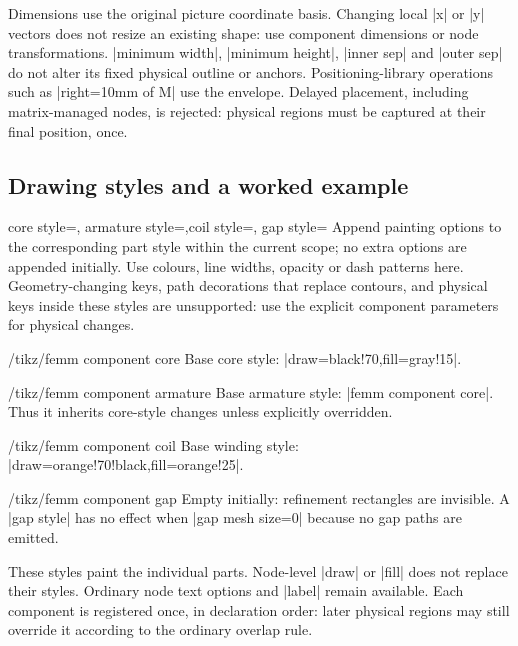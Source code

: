 Dimensions use the original picture coordinate basis. Changing local |x|
or |y| vectors does not resize an existing shape: use component dimensions or
node transformations. |minimum width|, |minimum height|, |inner sep| and
|outer sep| do not alter its fixed physical outline or anchors.
Positioning-library operations such as |right=10mm of M| use the envelope.
Delayed placement, including matrix-managed nodes, is rejected: physical
regions must be captured at their final position, once.

\subsection{Drawing styles and a worked example}
\begin{keylist}{core style=,
  armature style=,coil style=,
  gap style=}
Append painting options to the corresponding part style within the current
scope; no extra options are appended initially. Use colours, line widths,
opacity or dash patterns here. Geometry-changing keys, path decorations
that replace contours, and physical keys inside these styles are unsupported:
use the explicit component parameters for physical changes.
\end{keylist}
\begin{stylekey}{/tikz/femm component core}
Base core style: |draw=black!70,fill=gray!15|.
\end{stylekey}
\begin{stylekey}{/tikz/femm component armature}
Base armature style: |femm component core|. Thus it inherits core-style changes
unless explicitly overridden.
\end{stylekey}
\begin{stylekey}{/tikz/femm component coil}
Base winding style: |draw=orange!70!black,fill=orange!25|.
\end{stylekey}
\begin{stylekey}{/tikz/femm component gap}
Empty initially: refinement rectangles are invisible. A |gap style| has
no effect when |gap mesh size=0| because no gap paths are emitted.
\end{stylekey}
These styles paint the individual parts. Node-level |draw| or |fill| does not
replace their styles. Ordinary node text options and |label| remain available.
Each component is registered once, in declaration order: later physical
regions may still override it according to the ordinary overlap rule.

